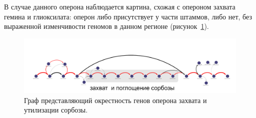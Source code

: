 В случае данного оперона наблюдается картина, схожая с опероном захвата гемина и глиоксилата: оперон либо присутствует у части штаммов, либо нет, без выраженной изменчивости геномов в данном регионе (рисунок~\ref{img:sorbitol}). 

\begin{figure}[!ht] 
	\center
	\includegraphics[width=\textwidth]{Dissertation/images/subgraphs/sorbitol.png}
	\caption{Граф представляющий окрестность генов оперона захвата и утилизации сорбозы. }
	\label{img:sorbitol} 
\end{figure}

